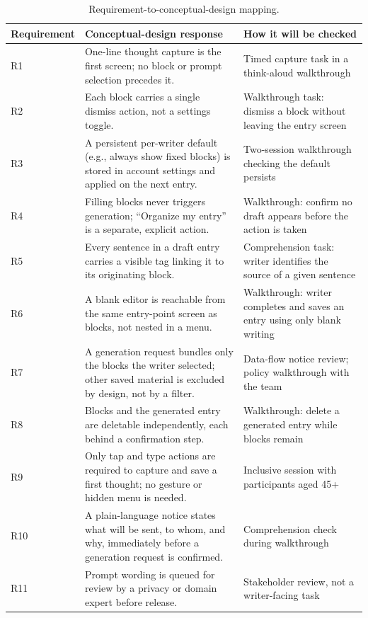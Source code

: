 \documentclass[sigconf,nonacm]{acmart}
\begin{document}
\begin{table}[tb]
  \caption{Requirement-to-conceptual-design mapping.}
  \label{tab:designmapping}
  \begin{tabularx}{\textwidth}{@{}l X X@{}}
    \toprule
    Requirement & Conceptual-design response & How it will be checked \\
    \midrule
    R1 & One-line thought capture is the first screen; no block or prompt selection precedes it. & Timed capture task in a think-aloud walkthrough \\
    R2 & Each block carries a single dismiss action, not a settings toggle. & Walkthrough task: dismiss a block without leaving the entry screen \\
    R3 & A persistent per-writer default (e.g., always show fixed blocks) is stored in account settings and applied on the next entry. & Two-session walkthrough checking the default persists \\
    R4 & Filling blocks never triggers generation; ``Organize my entry'' is a separate, explicit action. & Walkthrough: confirm no draft appears before the action is taken \\
    R5 & Every sentence in a draft entry carries a visible tag linking it to its originating block. & Comprehension task: writer identifies the source of a given sentence \\
    R6 & A blank editor is reachable from the same entry-point screen as blocks, not nested in a menu. & Walkthrough: writer completes and saves an entry using only blank writing \\
    R7 & A generation request bundles only the blocks the writer selected; other saved material is excluded by design, not by a filter. & Data-flow notice review; policy walkthrough with the team \\
    R8 & Blocks and the generated entry are deletable independently, each behind a confirmation step. & Walkthrough: delete a generated entry while blocks remain \\
    R9 & Only tap and type actions are required to capture and save a first thought; no gesture or hidden menu is needed. & Inclusive session with participants aged 45+ \\
    R10 & A plain-language notice states what will be sent, to whom, and why, immediately before a generation request is confirmed. & Comprehension check during walkthrough \\
    R11 & Prompt wording is queued for review by a privacy or domain expert before release. & Stakeholder review, not a writer-facing task \\

\end{tabularx}
\end{table}
\end{document}
